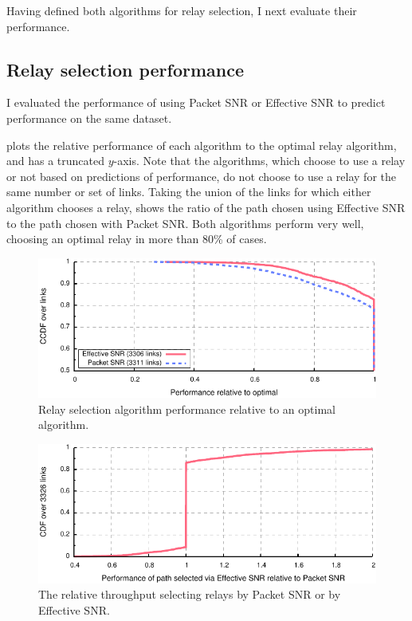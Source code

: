 Having defined both algorithms for relay selection, I next evaluate their performance.

\subsection{Relay selection performance}
I evaluated the performance of  using Packet SNR or Effective SNR to predict performance on the same dataset.

 plots the relative performance of each algorithm to the optimal relay algorithm, and has a truncated $y$-axis. Note that the algorithms, which choose to use a relay or not based on predictions of performance, do not choose to use a relay for the same number or set of links. Taking the union of the links for which either algorithm chooses a relay,  shows the ratio of the path chosen using Effective SNR to the path chosen with Packet SNR. Both algorithms perform very well, choosing an optimal relay in more than 80\% of cases.

\begin{figure}[t]
	\centering
	\includegraphics[width=\textwidth]{figures/applications/relay_ratio_opt.pdf}
	\caption[Relay selection algorithm performance relative to an optimal algorithm]{\label{fig:relay_ratio_opt}Relay selection algorithm performance relative to an optimal algorithm.}
\end{figure}
\begin{figure}[t]
	\centering
	\includegraphics[width=\textwidth]{figures/applications/relay_ratio.pdf}
	\caption[The relative throughput selecting relays by Packet SNR or by Effective SNR]{\label{fig:relay_ratio}The relative throughput selecting relays by Packet SNR or by Effective SNR.}
\end{figure}

